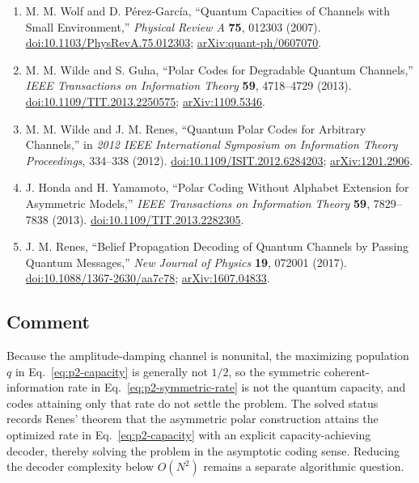 \begin{enumerate}[label={},leftmargin=4.8em,labelsep=0.5em]
  \footnotesize
  \item[\textup{[WPG07]}]\label{ref:p2-wolf}
  M. M. Wolf and D. P\'erez-Garc\'ia, ``Quantum Capacities of Channels with
  Small Environment,'' \emph{Physical Review A} \textbf{75}, 012303 (2007).
  \href{https://doi.org/10.1103/PhysRevA.75.012303}{doi:10.1103/PhysRevA.75.012303};
  \href{https://arxiv.org/abs/quant-ph/0607070}{arXiv:quant-ph/0607070}.

  \item[\textup{[WG13]}]\label{ref:p2-wilde-guha}
  M. M. Wilde and S. Guha, ``Polar Codes for Degradable Quantum Channels,''
  \emph{IEEE Transactions on Information Theory} \textbf{59}, 4718--4729
  (2013). \href{https://doi.org/10.1109/TIT.2013.2250575}{doi:10.1109/TIT.2013.2250575};
  \href{https://arxiv.org/abs/1109.5346}{arXiv:1109.5346}.

  \item[\textup{[WR12]}]\label{ref:p2-wilde-renes}
  M. M. Wilde and J. M. Renes, ``Quantum Polar Codes for Arbitrary Channels,''
  in \emph{2012 IEEE International Symposium on Information Theory
  Proceedings}, 334--338 (2012).
  \href{https://doi.org/10.1109/ISIT.2012.6284203}{doi:10.1109/ISIT.2012.6284203};
  \href{https://arxiv.org/abs/1201.2906}{arXiv:1201.2906}.

  \item[\textup{[HY13]}]\label{ref:p2-honda-yamamoto}
  J. Honda and H. Yamamoto, ``Polar Coding Without Alphabet Extension for
  Asymmetric Models,'' \emph{IEEE Transactions on Information Theory}
  \textbf{59}, 7829--7838 (2013).
  \href{https://doi.org/10.1109/TIT.2013.2282305}{doi:10.1109/TIT.2013.2282305}.

  \item[\textup{[Ren17]}]\label{ref:p2-renes-belief-propagation}
  J. M. Renes, ``Belief Propagation Decoding of Quantum Channels by Passing
  Quantum Messages,'' \emph{New Journal of Physics} \textbf{19}, 072001
  (2017). \href{https://doi.org/10.1088/1367-2630/aa7c78}%
       {doi:10.1088/1367-2630/aa7c78};
  \href{https://arxiv.org/abs/1607.04833}{arXiv:1607.04833}.
\end{enumerate}

\subsection*{Comment}

Because the amplitude-damping channel is nonunital, the maximizing population
$q$ in Eq.~\eqref{eq:p2-capacity} is generally not $1/2$, so the symmetric
coherent-information rate in Eq.~\eqref{eq:p2-symmetric-rate} is not the
quantum capacity, and codes attaining only that rate do not settle the
problem.  The solved status records Renes' theorem that the asymmetric polar
construction attains the optimized rate in Eq.~\eqref{eq:p2-capacity} with
an explicit capacity-achieving decoder, thereby solving the problem in the
asymptotic coding sense.  Reducing the decoder complexity below $O(N^2)$
remains a separate algorithmic question.

